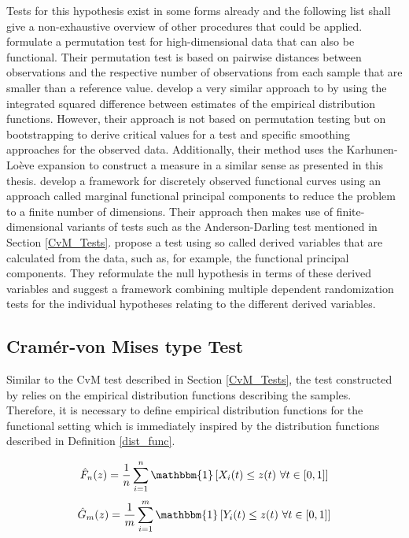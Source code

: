 \documentclass[12pt, a4paper]{article}
\theoremstyle{MAstyle} \newtheorem{assumption}{Assumption}[section]
\theoremstyle{MAstyle} \newtheorem{definition}{Definition}[section]
\theoremstyle{MAstyle} \newtheorem{theorem}{Theorem}[section]
\begin{document}
			Tests for this hypothesis exist in some forms already and the following list shall give a non-exhaustive overview of other procedures that could be applied. \cite{hall_permutation_2002} formulate a permutation test for high-dimensional data that can also be functional. Their permutation test is based on pairwise distances between observations and the respective number of observations from each sample that are smaller than a reference value. 			
			\cite{hall_two-sample_2007} develop a very similar approach to \cite{bugni_permutation_2021}by using the integrated squared difference between estimates of the empirical distribution functions. However, their approach is not based on permutation testing but on bootstrapping to derive critical values for a test and specific smoothing approaches for the observed data. Additionally, their method uses the Karhunen-Lo\`{e}ve expansion to construct a measure in a similar sense as presented in this thesis.
			\cite{pomann_two-sample_2016} develop a framework for discretely observed functional curves using an approach called marginal functional principal components to reduce the problem to a finite number of dimensions. Their approach then makes use of finite-dimensional variants of tests such as the Anderson-Darling test mentioned in Section \ref{CvM_Tests}.
			\cite{corain_new_2014} propose a test using so called derived variables that are calculated from the data, such as, for example, the functional principal components. They reformulate the null hypothesis in terms of these derived variables and suggest a framework combining multiple dependent randomization tests for the individual hypotheses relating to the different derived variables.
		
		\subsection{Cram\'{e}r-von Mises type Test}\label{cvm_type_test}
			Similar to the CvM test described in Section \ref{CvM_Tests}, the test constructed by \cite{bugni_permutation_2021} relies on the empirical distribution functions describing the samples. 
			Therefore, it is necessary to define empirical distribution functions for the functional setting which is immediately inspired by the distribution functions described in Definition \ref{dist_func}.
			\begin{multicols}{2}
				\noindent
				\begin{equation*}
					\hat{F}_n(z) = \frac{1}{n} \sum_{i = 1}^{n}\mathbbm{1}\left[X_i(t) \leq z(t) \ \forall t \in [0,1]\right]
				\end{equation*}
				\begin{equation}
					\hat{G}_m(z) = \frac{1}{m} \sum_{i = 1}^{m}\mathbbm{1}\left[Y_i(t) \leq z(t) \ \forall t \in [0,1]\right]
				\end{equation}
			\end{multicols}
			
\end{document}
